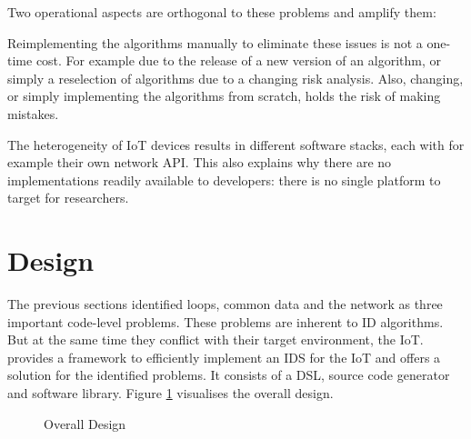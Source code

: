\documentclass[conference]{IEEEtran}
\begin{document}
Two operational aspects are orthogonal to these problems and amplify them:

\begin{LaTeXdescription}
  
  \item[Reimplementing] the algorithms manually to eliminate these issues is
  not a one-time cost. For example due to the release of a new version of an
  algorithm, or simply a reselection of algorithms due to a changing risk
  analysis. Also, changing, or simply implementing the algorithms from scratch,
  holds the risk of making mistakes.

  \item[The heterogeneity of IoT devices] results in different software stacks,
  each with for example their own network API\@. This also explains why there
  are no implementations readily available to developers: there is no single
  platform to target for researchers.

\end{LaTeXdescription}

\section{Design}
\label{design}

The previous sections identified loops, common data and the network as three
important code-level problems. These problems are inherent to ID algorithms.
But at the same time they conflict with their target environment, the IoT\@.
\NAME provides a framework to efficiently implement an IDS for the IoT and
offers a solution for the identified problems. It consists of a DSL, source
code generator and software library. Figure \ref{fig:design} visualises the
overall design.

\begin{figure}[ht]
  \centering
\caption{Overall Design}
\label{fig:design}
\end{figure}
\end{document}
